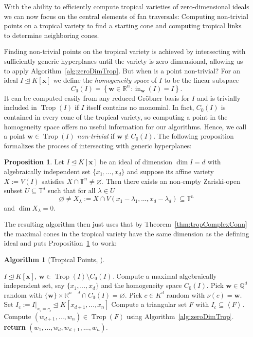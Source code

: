 \documentclass[
  paper=a4,
  titlepage,
  bibliography=totoc,
  listof=totoc,
  pagesize=pdftex
]{scrartcl}
\numberwithin{figure}{section}
\numberwithin{equation}{section}
\numberwithin{table}{section}
\newcommand*\setR{\mathds{R}}
\newcommand*\setQ{\mathds{Q}}
\newcommand*\setT{\mathds{T}}
\newcommand*\ideal[1]{\left\langle #1 \right\rangle}
\let\vec\mathbf
\let\idealof\trianglelefteq
\DeclareMathOperator{\Trop}{Trop}
\DeclareMathOperator{\initial}{in}
\theoremstyle{definition}
\newtheorem{proposition}[definition]{Proposition}
\newtheorem{algo}[definition]{Algorithm}
\numberwithin{definition}{section}
\begin{document}
With the ability to efficiently compute tropical varieties of zero-dimensional ideals we
can now focus on the central elements of fan traversals: Computing non-trivial points on a
tropical variety to find a starting cone and computing tropical links to determine
neighboring cones.

Finding non-trivial points on the tropical variety is achieved by intersecting with
sufficiently generic hyperplanes until the variety is zero-dimensional, allowing us to
apply Algorithm~\ref{alg:zeroDimTrop}. But when is a point non-trivial? For an ideal $I
\idealof K[\vec x]$ we define the \emph{homogeneity space} of $I$ to be the linear
subspace
\[
  C_0(I) = \left\{ \vec w \in \setR^n : \initial_{\vec w}(I) = I \right\}.
\]
It can be computed easily from any reduced Gröbner basis for $I$ and is trivially included
in $\Trop(I)$ if $I$ itself contains no monomial. In fact, $C_0(I)$ is contained in every
cone of the tropical variety, so computing a point in the homogeneity space offers no
useful information for our algorithms. Hence, we call a point $\vec w \in \Trop(I)$
\emph{non-trivial} if $\vec w \not\in C_0(I)$. The following proposition formalizes the
process of intersecting with generic hyperplanes:

\begin{proposition}
  Let $I \idealof K[\vec x]$ be an ideal of dimension $\dim I = d$ with algebraically
  independent set $\{x_1, \dots, x_d\}$ and suppose its affine variety $X := V(I)$
  satisfies $X \cap \setT^n \neq \varnothing$. Then there exists an non-empty Zariski-open
  subset $U \subseteq \setT^d$ such that for all $\lambda \in U$
  \[
    \varnothing \neq X_\lambda :=
    X \cap V(x_1-\lambda_1, \dots, x_d - \lambda_d) \subseteq \setT^n
  \]
  and $\dim X_\lambda = 0$.
  \label{prp:intersHyperp}
\end{proposition}

The resulting algorithm then just uses that by Theorem~\ref{thm:tropComplexConn} the
maximal cones in the tropical variety have the same dimension as the defining ideal and
puts Proposition~\ref{prp:intersHyperp} to work:

\begin{algo}[Tropical Points, {\cite[Algorithm~3.3]{tropPointsLinks}}] $ $
  \begin{algorithmic}[1]
    \Require $I \idealof K[\vec x]$,
    \Ensure $\vec w \in \Trop(I) \setminus C_0(I)$.
    \State Compute a maximal algebraically independent set, say $\{x_1, \dots, x_d\}$ and
    the homogeneity space $C_0(I)$.
    \Repeat
      \State Pick $\vec w \in \setQ^d$ random with $\{\vec w\} \times \setR^{n-d} \cap
        C_0(I) = \varnothing$.
      \State Pick $c \in K^d$ random with $\nu(c) = \vec w$.
      \State Set $I_c := I|_{x_i = c_i} \idealof K[x_{d+1}, \dots, x_n]$
    \Until{$\dim(I_c) = 0$ and $V(I_c) \subseteq \setT^{n-d}$}
    \State Compute a triangular set $F$ with $I_c \subseteq \ideal F$.
    \State Compute $(w_{d+1}, \dots, w_n) \in \Trop(F)$ using
      Algorithm~\ref{alg:zeroDimTrop}.
    \State\textbf{return} $(w_1, \dots, w_d, w_{d+1}, \dots, w_n)$.
  \end{algorithmic}
  \label{alg:tropicalPoint}
\end{algo}
\end{document}
